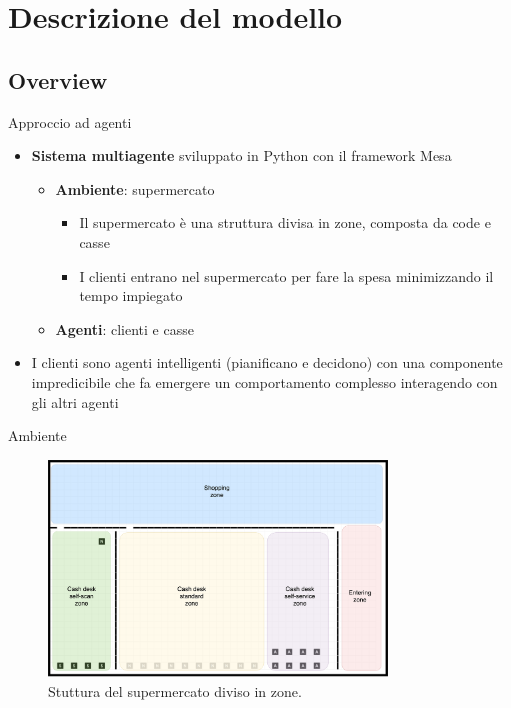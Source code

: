 \section{Descrizione del modello}

\subsection{Overview}
\begin{frame}{Approccio ad agenti}
	\begin{itemize}
		\item \textbf{Sistema multiagente} sviluppato in Python con il framework Mesa
		\begin{itemize}
			\item \textbf{Ambiente}: supermercato
			\begin{itemize}
				\item Il supermercato è una struttura divisa in zone, composta da code e casse
				\item I clienti entrano nel supermercato per fare la spesa minimizzando il tempo impiegato
			\end{itemize}
			\item \textbf{Agenti}: clienti e casse
		\end{itemize}
		
		\item I clienti sono agenti intelligenti (pianificano e decidono) con una componente impredicibile che fa emergere un comportamento complesso interagendo con gli altri agenti
	\end{itemize}
\end{frame}

\begin{frame}{Ambiente}
	
	\begin{figure}[H]
		\centering
		\includegraphics[width=9cm]{"../report/images/supermarket-start-zones.png"}
		\caption{Stuttura del supermercato diviso in zone.}
		\label{fig:supermarket_zones}
	\end{figure}
	
	
\end{frame}


